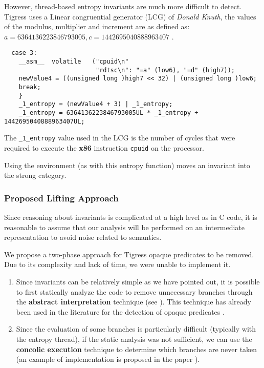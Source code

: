 \documentclass{projectreport}
\begin{document}
However, thread-based entropy invariants are much more difficult to detect. Tigress uses a Linear congruential generator (\textsf{LCG}) of \textit{Donald Knuth}, the values of the
modulus, multiplier and increment are as defined as: $a = 6364136223846793005, c = 1442695040888963407$ \cite{knuth}.

\begin{verbatim}
  case 3: 
    __asm__  volatile   ("cpuid\n"
                         "rdtsc\n": "=a" (low6), "=d" (high7));
    newValue4 = ((unsigned long )high7 << 32) | (unsigned long )low6;
    break;
    }
    _1_entropy = (newValue4 + 3) | _1_entropy;
    _1_entropy = 6364136223846793005UL * _1_entropy + 1442695040888963407UL;
\end{verbatim}

The \verb|_1_entropy| value used in the \textsf{LCG} is the number of cycles that were required to execute the \textbf{x86} instruction \verb|cpuid| on the processor.

Using the environment (as with this entropy function) moves an invariant into the strong category.

\subsubsection{Proposed Lifting Approach}

Since reasoning about invariants is complicated at a high level as in C code, it is reasonable to assume that our analysis will be performed on an intermediate representation to avoid noise related to semantics.

We propose a two-phase approach for Tigress opaque predicates to be removed. Due to its complexity and lack of time, we were unable to implement it.

\begin{enumerate}
    \item Since invariants can be relatively simple as we have pointed out, it is possible to first statically analyze the code to remove unnecessary branches through the \textbf{abstract interpretation} technique (see \cite{abstract}). This technique has already been used in the literature for the detection of opaque predicates \cite{abstract_detection}.
    \item Since the evaluation of some branches is particularly difficult (typically with the entropy thread), if the static analysis was not sufficient, we can use the \textbf{concolic execution} technique to determine which branches are never taken (an example of implementation is proposed in the paper  \cite{concolic}).
\end{enumerate}
\end{document}
